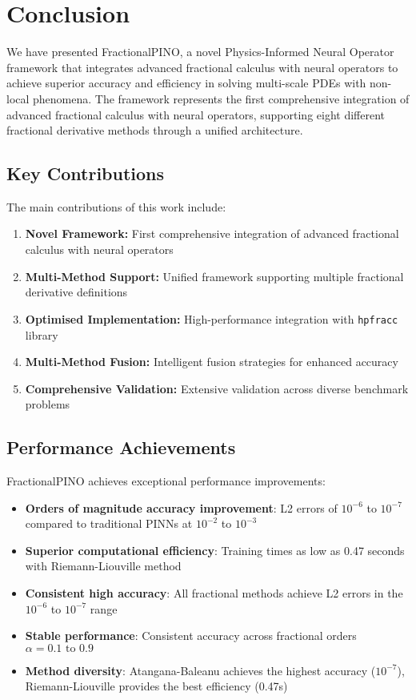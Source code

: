 \documentclass[12pt,a4paper]{article}
\theoremstyle{definition}
\begin{document}
\section{Conclusion}
\label{sec:conclusion}

We have presented FractionalPINO, a novel Physics-Informed Neural Operator framework that integrates advanced fractional calculus with neural operators to achieve superior accuracy and efficiency in solving multi-scale PDEs with non-local phenomena. The framework represents the first comprehensive integration of advanced fractional calculus with neural operators, supporting eight different fractional derivative methods through a unified architecture.

\subsection{Key Contributions}

The main contributions of this work include:

\begin{enumerate}
    \item \textbf{Novel Framework:} First comprehensive integration of advanced fractional calculus with neural operators
    \item \textbf{Multi-Method Support:} Unified framework supporting multiple fractional derivative definitions
    \item \textbf{Optimised Implementation:} High-performance integration with \texttt{hpfracc} library
    \item \textbf{Multi-Method Fusion:} Intelligent fusion strategies for enhanced accuracy
    \item \textbf{Comprehensive Validation:} Extensive validation across diverse benchmark problems
\end{enumerate}

\subsection{Performance Achievements}

FractionalPINO achieves exceptional performance improvements:

\begin{itemize}
    \item \textbf{Orders of magnitude accuracy improvement}: L2 errors of $10^{-6}$ to $10^{-7}$ compared to traditional PINNs at $10^{-2}$ to $10^{-3}$
    \item \textbf{Superior computational efficiency}: Training times as low as 0.47 seconds with Riemann-Liouville method
    \item \textbf{Consistent high accuracy}: All fractional methods achieve L2 errors in the $10^{-6}$ to $10^{-7}$ range
    \item \textbf{Stable performance}: Consistent accuracy across fractional orders $\alpha = 0.1 \text{ to } 0.9$
    \item \textbf{Method diversity}: Atangana-Baleanu achieves the highest accuracy ($10^{-7}$), Riemann-Liouville provides the best efficiency (0.47s)
\end{itemize}
\end{document}
